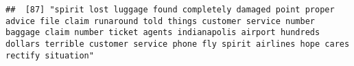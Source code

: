 \documentclass[
]{article}
\begin{document}
\begin{verbatim}
##  [87] "spirit lost luggage found completely damaged point proper advice file claim runaround told things customer service number baggage claim number ticket agents indianapolis airport hundreds dollars terrible customer service phone fly spirit airlines hope cares rectify situation"                                                                                                                                                                                                                                                                                                                                                                                                                                                                                                                                                                                                                                                                                                                                                                                                                                                                                                                                                                                                                                                                                                                                                                                                                                                                                                                                                                                                                                                                                                           

\end{verbatim}
\end{document}
